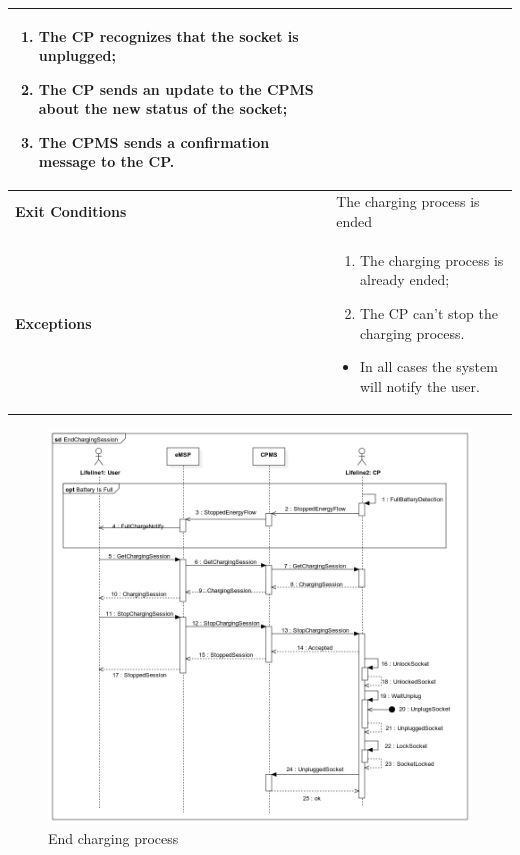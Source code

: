 \documentclass{Configuration_Files/PoliMi3i_thesis}
\begin{document}
\begin{table}[H]
\begin{xltabular}{\textwidth}{| >{}l | X |}
\begin{enumerate}
        \item The CP recognizes that the socket is unplugged;
        \item The CP sends an update to the CPMS about the new status of the socket;
        \item The CPMS sends a confirmation message to the CP.
        \end{enumerate}\B\\
    \hline
    \textbf{Exit Conditions} & The charging process is ended\B\\
    \hline
    \textbf{Exceptions} & 
    \begin{enumerate}
        \item The charging process is already ended;
        \item The CP can’t stop the charging process.
    \end{enumerate}
    \begin{itemize}
        \item In all cases the system will notify the user.
    \end{itemize}\B\\
    \hline
    \end{xltabular}
\end{table}

\begin{figure}[H]
    \centering
    \includegraphics[width=1\textwidth]{Images/UseCases/EndChargingSession.jpg}
    \caption{End charging process}
\end{figure}
\end{document}
